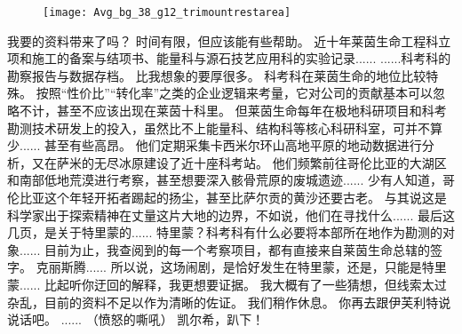 \documentclass[openany]{book}
\begin{document}
\begin{figure}[h]
    \centering
    \texttt{[image: Avg\_bg\_38\_g12\_trimountrestarea]}
\end{figure}
\begin{dialogue}
     我要的资料带来了吗？
     时间有限，但应该能有些帮助。
     近十年莱茵生命工程科立项和施工的备案与结项书、能量科与源石技艺应用科的实验记录......
     ......科考科的勘察报告与数据存档。
     比我想象的要厚很多。
     科考科在莱茵生命的地位比较特殊。
     按照“性价比”“转化率”之类的企业逻辑来考量，它对公司的贡献基本可以忽略不计，甚至不应该出现在莱茵十科里。
     但莱茵生命每年在极地科研项目和科考勘测技术研发上的投入，虽然比不上能量科、结构科等核心科研科室，可并不算少......
     甚至有些高昂。
     他们定期采集卡西米尔环山高地平原的地动数据进行分析，又在萨米的无尽冰原建设了近十座科考站。
     他们频繁前往哥伦比亚的大湖区和南部低地荒漠进行考察，甚至想要深入骸骨荒原的废城遗迹......
     少有人知道，哥伦比亚这个年轻开拓者踢起的扬尘，甚至比萨尔贡的黄沙还要古老。
     与其说这是科学家出于探索精神在丈量这片大地的边界，不如说，他们在寻找什么......
     最后这几页，是关于特里蒙的......
     特里蒙？科考科有什么必要将本部所在地作为勘测的对象......
     目前为止，我查阅到的每一个考察项目，都有直接来自莱茵生命总辖的签字。
     克丽斯腾......
     所以说，这场闹剧，是恰好发生在特里蒙，还是，只能是特里蒙......
     比起听你迂回的解释，我更想要证据。
     我大概有了一些猜想，但线索太过杂乱，目前的资料不足以作为清晰的佐证。
     我们稍作休息。
     你再去跟伊芙利特说说话吧。
     ......
     （愤怒的嘶吼）
     凯尔希，趴下！
\end{dialogue}
\end{document}
